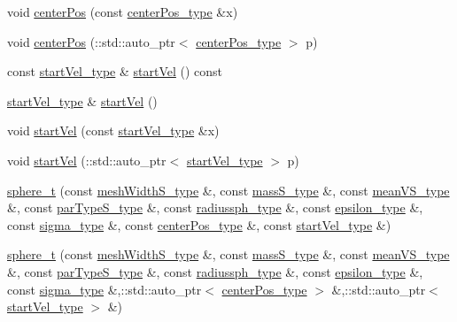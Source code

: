 \begin{DoxyCompactItemize}
void \hyperlink{classsphere__t_a7e0811ee3fc01b1f56a5ff5d2befe2ed}{center\-Pos} (const \hyperlink{classsphere__t_a2786a8606da5d1dfbb50a237d6834daf}{center\-Pos\-\_\-type} \&x)
\item 
void \hyperlink{classsphere__t_af5325adce34c03d4129b68a157d84ff5}{center\-Pos} (\-::std\-::auto\-\_\-ptr$<$ \hyperlink{classsphere__t_a2786a8606da5d1dfbb50a237d6834daf}{center\-Pos\-\_\-type} $>$ p)
\item 
const \hyperlink{classsphere__t_a0235d82d12e4f91c5656e8ae64da4ca6}{start\-Vel\-\_\-type} \& \hyperlink{classsphere__t_a515c45cb578f2098d9b72a72d228177c}{start\-Vel} () const 
\item 
\hyperlink{classsphere__t_a0235d82d12e4f91c5656e8ae64da4ca6}{start\-Vel\-\_\-type} \& \hyperlink{classsphere__t_a9a05fb6903f3e692a147ed2f96e5366f}{start\-Vel} ()
\item 
void \hyperlink{classsphere__t_af90d096a5f304d0498b49a75db827344}{start\-Vel} (const \hyperlink{classsphere__t_a0235d82d12e4f91c5656e8ae64da4ca6}{start\-Vel\-\_\-type} \&x)
\item 
void \hyperlink{classsphere__t_a373f8ac14a2862eb64c17e89ac7c408d}{start\-Vel} (\-::std\-::auto\-\_\-ptr$<$ \hyperlink{classsphere__t_a0235d82d12e4f91c5656e8ae64da4ca6}{start\-Vel\-\_\-type} $>$ p)
\item 
\hyperlink{classsphere__t_a69bf9cbbe2c853fff09e9581ea99846e}{sphere\-\_\-t} (const \hyperlink{classsphere__t_a82740a9c5aa0437d973ee3e3caad09ea}{mesh\-Width\-S\-\_\-type} \&, const \hyperlink{classsphere__t_a317ddc20b1a4fa225c55721bf12c67b2}{mass\-S\-\_\-type} \&, const \hyperlink{classsphere__t_a351152e9b83bac409a627037b99a209b}{mean\-V\-S\-\_\-type} \&, const \hyperlink{classsphere__t_a750fe86f76f8c344ccb25e7dc73c2655}{par\-Type\-S\-\_\-type} \&, const \hyperlink{classsphere__t_a81d467c00ec72dc7b9907b521744696d}{radiussph\-\_\-type} \&, const \hyperlink{classsphere__t_a9e61f3d5ab269b28a198f4b47519ac3f}{epsilon\-\_\-type} \&, const \hyperlink{classsphere__t_a20806454a1e5e7f7fb50b22a49aef704}{sigma\-\_\-type} \&, const \hyperlink{classsphere__t_a2786a8606da5d1dfbb50a237d6834daf}{center\-Pos\-\_\-type} \&, const \hyperlink{classsphere__t_a0235d82d12e4f91c5656e8ae64da4ca6}{start\-Vel\-\_\-type} \&)
\item 
\hyperlink{classsphere__t_aef6946f51adfefdbd01c0e5787b8e9b1}{sphere\-\_\-t} (const \hyperlink{classsphere__t_a82740a9c5aa0437d973ee3e3caad09ea}{mesh\-Width\-S\-\_\-type} \&, const \hyperlink{classsphere__t_a317ddc20b1a4fa225c55721bf12c67b2}{mass\-S\-\_\-type} \&, const \hyperlink{classsphere__t_a351152e9b83bac409a627037b99a209b}{mean\-V\-S\-\_\-type} \&, const \hyperlink{classsphere__t_a750fe86f76f8c344ccb25e7dc73c2655}{par\-Type\-S\-\_\-type} \&, const \hyperlink{classsphere__t_a81d467c00ec72dc7b9907b521744696d}{radiussph\-\_\-type} \&, const \hyperlink{classsphere__t_a9e61f3d5ab269b28a198f4b47519ac3f}{epsilon\-\_\-type} \&, const \hyperlink{classsphere__t_a20806454a1e5e7f7fb50b22a49aef704}{sigma\-\_\-type} \&,\-::std\-::auto\-\_\-ptr$<$ \hyperlink{classsphere__t_a2786a8606da5d1dfbb50a237d6834daf}{center\-Pos\-\_\-type} $>$ \&,\-::std\-::auto\-\_\-ptr$<$ \hyperlink{classsphere__t_a0235d82d12e4f91c5656e8ae64da4ca6}{start\-Vel\-\_\-type} $>$ \&)

\end{DoxyCompactItemize}
